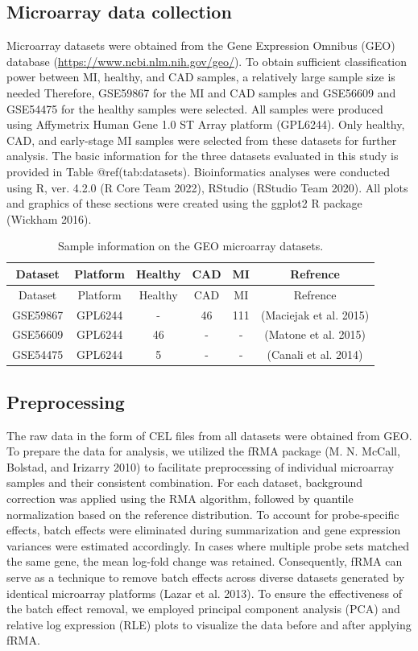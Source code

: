 \documentclass[smallextended]{svjour3}       %
\begin{document}
\hypertarget{microarray-data-collection}{%
\subsection{Microarray data
collection}\label{microarray-data-collection}}

Microarray datasets were obtained from the Gene Expression Omnibus (GEO)
database (\url{https://www.ncbi.nlm.nih.gov/geo/}). To obtain sufficient
classification power between MI, healthy, and CAD samples, a relatively
large sample size is needed Therefore, GSE59867 for the MI and CAD
samples and GSE56609 and GSE54475 for the healthy samples were selected.
All samples were produced using Affymetrix Human Gene 1.0 ST Array
platform (GPL6244). Only healthy, CAD, and early-stage MI samples were
selected from these datasets for further analysis. The basic information
for the three datasets evaluated in this study is provided in Table
@ref(tab:datasets). Bioinformatics analyses were conducted using R, ver.
4.2.0 (R Core Team 2022), RStudio (RStudio Team 2020). All plots and
graphics of these sections were created using the ggplot2 R package
(Wickham 2016).

\begin{longtable}[]{@{}cccccc@{}}
\caption{Sample information on the GEO microarray
datasets.}\tabularnewline
\toprule()
Dataset & Platform & Healthy & CAD & MI & Refrence \\
\midrule()
\endfirsthead
\toprule()
Dataset & Platform & Healthy & CAD & MI & Refrence \\
\midrule()
\endhead
GSE59867 & GPL6244 & - & 46 & 111 & (Maciejak et al. 2015) \\
GSE56609 & GPL6244 & 46 & - & - & (Matone et al. 2015) \\
GSE54475 & GPL6244 & 5 & - & - & (Canali et al. 2014) \\
\bottomrule()
\end{longtable}

\hypertarget{preprocessing}{%
\subsection{Preprocessing}\label{preprocessing}}

The raw data in the form of CEL files from all datasets were obtained
from GEO. To prepare the data for analysis, we utilized the fRMA package
(M. N. McCall, Bolstad, and Irizarry 2010) to facilitate preprocessing
of individual microarray samples and their consistent combination. For
each dataset, background correction was applied using the RMA algorithm,
followed by quantile normalization based on the reference distribution.
To account for probe-specific effects, batch effects were eliminated
during summarization and gene expression variances were estimated
accordingly. In cases where multiple probe sets matched the same gene,
the mean log-fold change was retained. Consequently, fRMA can serve as a
technique to remove batch effects across diverse datasets generated by
identical microarray platforms (Lazar et al. 2013). To ensure the
effectiveness of the batch effect removal, we employed principal
component analysis (PCA) and relative log expression (RLE) plots to
visualize the data before and after applying fRMA.
\end{document}

